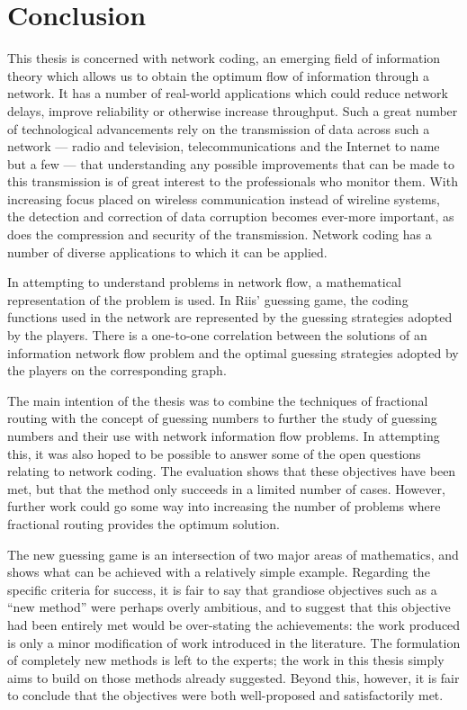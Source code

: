
\chapter{Conclusion}
\label{ch:conc}

This thesis is concerned with network coding, an emerging field of information theory which allows us to obtain the optimum flow of information through a network. It has a number of real-world applications which could reduce network delays, improve reliability or otherwise increase throughput. Such a great number of technological advancements rely on the transmission of data across such a network --- radio and television, telecommunications and the Internet to name but a few --- that understanding any possible improvements that can be made to this transmission is of great interest to the professionals who monitor them. With increasing focus placed on wireless communication instead of wireline systems, the detection and correction of data corruption becomes ever-more important, as does the compression and security of the transmission. Network coding has a number of diverse applications to which it can be applied.

In attempting to understand problems in network flow, a mathematical representation of the problem is used. In Riis' guessing game, the coding functions used in the network are represented by the guessing strategies adopted by the players. There is a one-to-one correlation between the solutions of an information network flow problem and the optimal guessing strategies adopted by the players on the corresponding graph.

The main intention of the thesis was to combine the techniques of fractional routing with the concept of guessing numbers to further the study of guessing numbers and their use with network information flow problems. In attempting this, it was also hoped to be possible to answer some of the open questions relating to network coding. The evaluation shows that these objectives have been met, but that the method only succeeds in a limited number of cases. However, further work could go some way into increasing the number of problems where fractional routing provides the optimum solution.

The new guessing game is an intersection of two major areas of mathematics, and shows what can be achieved with a relatively simple example. Regarding the specific criteria for success, it is fair to say that grandiose objectives such as a ``new method'' were perhaps overly ambitious, and to suggest that this objective had been entirely met would be over-stating the achievements: the work produced is only a minor modification of work introduced in the literature. The formulation of completely new methods is left to the experts; the work in this thesis simply aims to build on those methods already suggested. Beyond this, however, it is fair to conclude that the objectives were both well-proposed and satisfactorily met.

